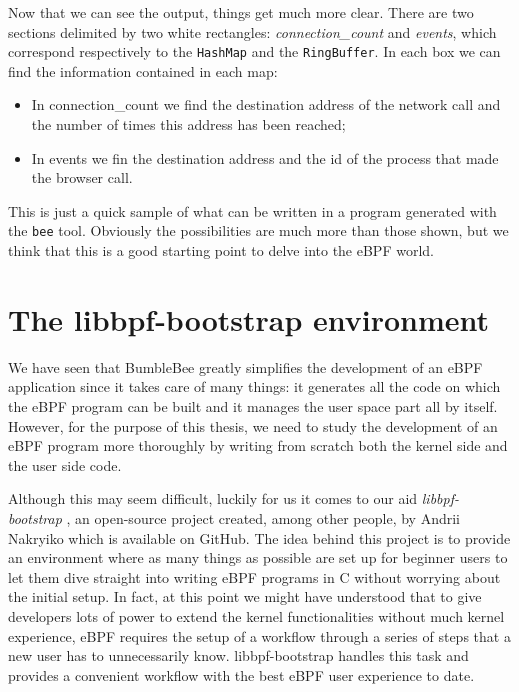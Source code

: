 Now that we can see the output, things get much more clear.
There are two sections delimited by two white rectangles: \textit{connection\_count} and \textit{events}, which correspond respectively to the \colorbox{backcolour}{\lstinline[style=commandline, language=bash, breaklines=true]|HashMap|} and the \colorbox{backcolour}{\lstinline[style=commandline, language=bash, breaklines=true]|RingBuffer|}.
In each box we can find the information contained in each map:

\begin{itemize}
	\item 
		In connection\_count we find the destination address of the network call and the number of times this address has been reached;
	\item 
		In events we fin the destination address and the id of the process that made the browser call.
\end{itemize}

This is just a quick sample of what can be written in a program generated with the \colorbox{backcolour}{\lstinline[style=commandline, language=bash, breaklines=true]|bee|} tool.
Obviously the possibilities are much more than those shown, but we think that this is a good starting point to delve into the eBPF world.

\section{The libbpf-bootstrap environment}

We have seen that BumbleBee greatly simplifies the development of an eBPF application since it takes care of many things: it generates all the code on which the eBPF program can be built and it manages the user space part all by itself.
However, for the purpose of this thesis, we need to study the development of an eBPF program more thoroughly by writing from scratch both the kernel side and the user side code.

Although this may seem difficult, luckily for us it comes to our aid \textit{libbpf-bootstrap} \cite{libbpfbootstrapGithubRepo}, an open-source project created, among other people, by Andrii Nakryiko which is available on GitHub.
The idea behind this project is to provide an environment where as many things as possible are set up for beginner users to let them dive straight into writing eBPF programs in C without worrying about the initial setup.
In fact, at this point we might have understood that to give developers lots of power to extend the kernel functionalities without much kernel experience, eBPF requires the setup of a workflow through a series of steps that a new user has to unnecessarily know.
libbpf-bootstrap handles this task and provides a convenient workflow with the best eBPF user experience to date.

